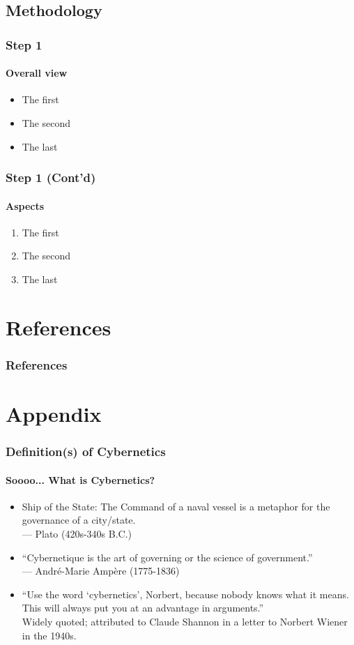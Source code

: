 \documentclass[
	11pt,
	aspectratio=169,
]{beamer}
\begin{document}
\subsection{Methodology}
\begin{frame}
\frametitle{Step 1}
\framesubtitle{Overall view}
	\begin{itemize}
		\item<1->The first
		\item<2->The second
		\item<3->The last
	\end{itemize}
\end{frame}
\begin{frame}
\frametitle{Step 1 (Cont'd)}
\framesubtitle{Aspects}
\begin{enumerate}
	\item<1->The first
	\item<2->The second
	\item<3->The last
\end{enumerate}
\end{frame}
\section{References}
	\begin{frame}[t,allowframebreaks]
		\frametitle{References}
		\printbibliography
	\end{frame}

\section*{Appendix}
	\begin{frame}
		\frametitle{Definition(s) of Cybernetics}
		\framesubtitle{Soooo... What is Cybernetics?}
		\begin{itemize}
			\item<1->Ship of the State: The Command of a naval vessel is a metaphor for the governance of a city/state.\\
			--- Plato (420s-340s B.C.)
			\item<2->``Cybernetique is the art of governing or the science of government.''\\
			--- André-Marie Ampère (1775-1836)
			\item<3->``Use the word ‘cybernetics’, Norbert, because nobody knows what it means. This will always put you at an advantage in arguments.''\\
			Widely quoted; attributed to Claude Shannon in a letter to Norbert Wiener in the 1940s.
		\end{itemize}
	\end{frame}
\end{document}
